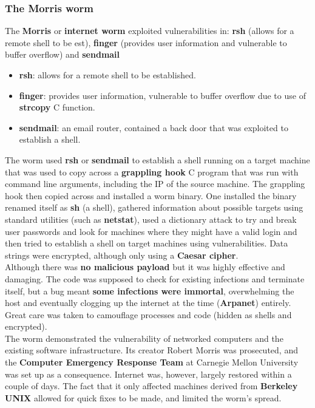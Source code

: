 \documentclass[final]{article}
\newcommand{\np}{\vspace{8pt} \\}
\begin{document}
\subsubsection{The Morris worm}
The \textbf{Morris} or \textbf{internet worm} exploited vulnerabilities in: \textbf{rsh} (allows for a remote shell to be est), \textbf{finger} (provides user information and vulnerable to buffer overflow) and \textbf{sendmail}
\begin{itemize}
	\item \textbf{rsh}: allows for a remote shell to be established.
	\item \textbf{finger}: provides user information, vulnerable to buffer overflow due to use of \textbf{strcopy} C function.
	\item \textbf{sendmail}: an email router, contained a back door that was exploited to establish a shell.
\end{itemize}
The worm used \textbf{rsh} or \textbf{sendmail} to establish a shell running on a target machine that was used to copy across a \textbf{grappling hook} C program that was run with command line arguments, including the IP of the source machine. The grappling hook then copied across and installed a worm binary. One installed the binary renamed itself as \textbf{sh} (a shell), gathered information about possible targets using standard utilities (such as \textbf{netstat}), used a dictionary attack to try and break user passwords and look for machines where they might have a valid login and then tried to establish a shell on target machines using vulnerabilities. Data strings were encrypted, although only using a \textbf{Caesar cipher}.
\pagebreak
\\
Although there was \textbf{no malicious payload} but it was highly effective and damaging. The code was supposed to check for existing infections and terminate itself, but a bug meant \textbf{some infections were immortal}, overwhelming the host and eventually clogging up the internet at the time (\textbf{Arpanet}) entirely. Great care was taken to camouflage processes and code (hidden as shells and encrypted). \np
The worm demonstrated the vulnerability of networked computers and the existing software infrastructure. Its creator Robert Morris was prosecuted, and the \textbf{Computer Emergency Response Team} at Carnegie Mellon University was set up as a consequence. Internet was, however, largely restored within a couple of days. The fact that it only affected machines derived from \textbf{Berkeley UNIX} allowed for quick fixes to be made, and limited the worm's spread.
\end{document}
